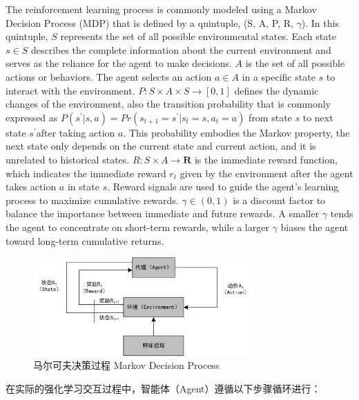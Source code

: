 The reinforcement learning process is commonly modeled using a Markov Decision Process (MDP) that is defined by a quintuple, (S, A, P, R, $\gamma$).
In this quintuple, $S$ represents the set of all possible environmental states. Each state $s\in S$ describes the complete information about the current environment and serves as the reliance for the agent to make decisions.
$A$ is the set of all possible actions or behaviors. The agent selects an action $a\in A$ in a specific state $s$ to interact with the environment.
$P:S\times A\times S \to [0,1]$ defines the dynamic changes of the environment, also the transition probability that is commonly expressed as $P(s^{'}|s,a)=Pr(s_{t+1}=s^{'}|s_{t}=s,a_{t}=a)$ from state $s$ to next state $s^{'}$after taking action $a$. This probability embodies the Markov property, the next state only depends on the current state and current action, and it is unrelated to historical states.
$R:S\times A \to \mathbf{R}$ is the immediate reward function, which indicates the immediate reward $r_{t}$ given by the environment after the agent takes action $a$ in state $s$. Reward signals are used to guide the agent’s learning process to maximize cumulative rewards.
$\gamma \in (0,1)$ is a discount factor to balance the importance between immediate and future rewards. A smaller $\gamma$ tends the agent to concentrate on short-term rewards, while a larger $\gamma$ biases the agent toward long-term cumulative returns.

\begin{figure}[hbt]
	\centering
	\includegraphics[width=0.75\textwidth]{figures/2.3}
	\caption{马尔可夫决策过程 Markov Decision Process}\label{fig:2.3}
\end{figure}

在实际的强化学习交互过程中，智能体（Agent）遵循以下步骤循环进行：

